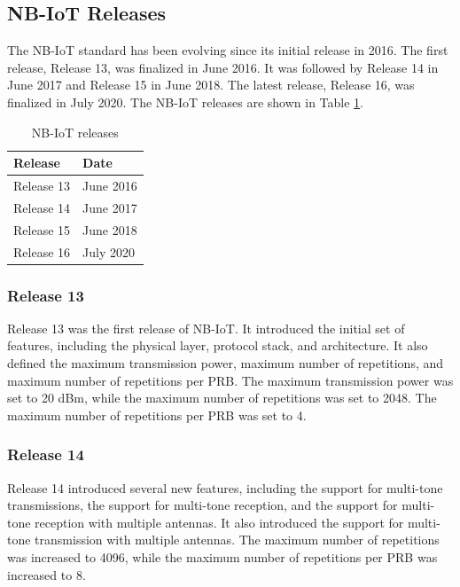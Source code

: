 \subsection{NB-IoT Releases}
The NB-IoT standard has been evolving since its initial release in 2016. The first release, Release 13, was finalized in June 2016. It was followed by Release 14 in June 2017 and Release 15 in June 2018. The latest release, Release 16, was finalized in July 2020. The NB-IoT releases are shown in Table \ref{tab:nb-iot-releases}.
\begin{table}[ht]
    \centering
    \begin{tabular}{|l|l|}
        \hline
        \textbf{Release} & \textbf{Date} \\ \hline
        Release 13 & June 2016 \\ \hline
        Release 14 & June 2017 \\ \hline
        Release 15 & June 2018 \\ \hline
        Release 16 & July 2020 \\ \hline
    \end{tabular}
    \caption{NB-IoT releases \cite{nb-iot-releases}}
    \label{tab:nb-iot-releases}
\end{table}

\subsubsection{Release 13}
Release 13 was the first release of NB-IoT. It introduced the initial set of features, including the physical layer, protocol stack, and architecture. It also defined the maximum transmission power, maximum number of repetitions, and maximum number of repetitions per PRB. The maximum transmission power was set to 20 dBm, while the maximum number of repetitions was set to 2048. The maximum number of repetitions per PRB was set to 4.

\subsubsection{Release 14}
Release 14 introduced several new features, including the support for multi-tone transmissions, the support for multi-tone reception, and the support for multi-tone reception with multiple antennas. It also introduced the support for multi-tone transmission with multiple antennas. The maximum number of repetitions was increased to 4096, while the maximum number of repetitions per PRB was increased to 8.

